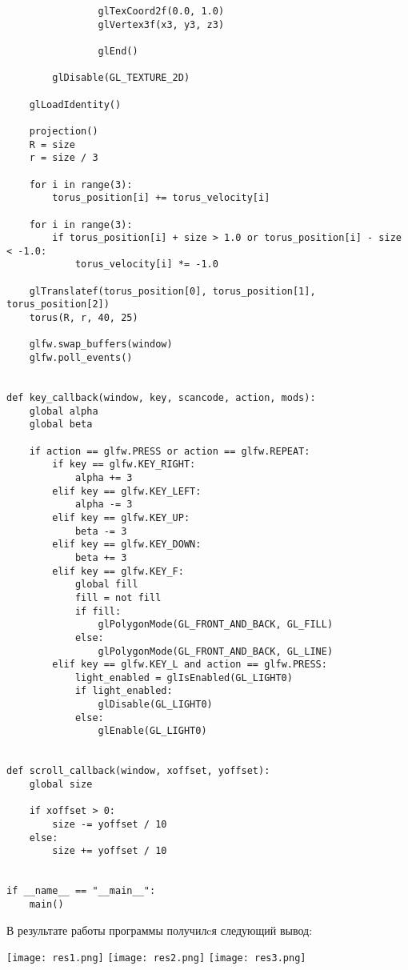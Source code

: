 \documentclass[a4paper, 14pt]{extarticle}
\begin{document}
\begin{lstlisting}
                glTexCoord2f(0.0, 1.0)
                glVertex3f(x3, y3, z3)

                glEnd()

        glDisable(GL_TEXTURE_2D)

    glLoadIdentity()

    projection()
    R = size
    r = size / 3

    for i in range(3):
        torus_position[i] += torus_velocity[i]

    for i in range(3):
        if torus_position[i] + size > 1.0 or torus_position[i] - size < -1.0:
            torus_velocity[i] *= -1.0

    glTranslatef(torus_position[0], torus_position[1], torus_position[2])
    torus(R, r, 40, 25)

    glfw.swap_buffers(window)
    glfw.poll_events()


def key_callback(window, key, scancode, action, mods):
    global alpha
    global beta

    if action == glfw.PRESS or action == glfw.REPEAT:
        if key == glfw.KEY_RIGHT:
            alpha += 3
        elif key == glfw.KEY_LEFT:
            alpha -= 3
        elif key == glfw.KEY_UP:
            beta -= 3
        elif key == glfw.KEY_DOWN:
            beta += 3
        elif key == glfw.KEY_F:
            global fill
            fill = not fill
            if fill:
                glPolygonMode(GL_FRONT_AND_BACK, GL_FILL)
            else:
                glPolygonMode(GL_FRONT_AND_BACK, GL_LINE)
        elif key == glfw.KEY_L and action == glfw.PRESS:
            light_enabled = glIsEnabled(GL_LIGHT0)
            if light_enabled:
                glDisable(GL_LIGHT0)
            else:
                glEnable(GL_LIGHT0)


def scroll_callback(window, xoffset, yoffset):
    global size

    if xoffset > 0:
        size -= yoffset / 10
    else:
        size += yoffset / 10


if __name__ == "__main__":
    main()
\end{lstlisting}
\pagebreak
В результате работы программы получилcя следующий вывод:
\begin{center}
    \texttt{[image: res1.png]}
    \newpage
    \texttt{[image: res2.png]}
    \newpage
    \texttt{[image: res3.png]}
\end{center}
\pagebreak
\end{document}
